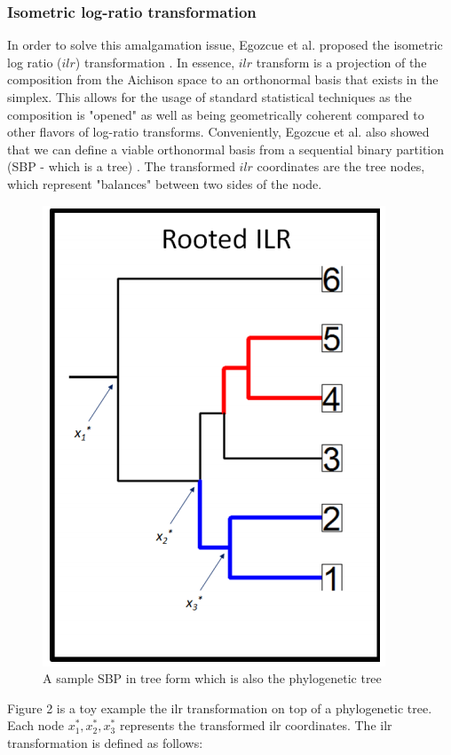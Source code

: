 \documentclass{article}
\begin{document}
\subsubsection{Isometric log-ratio transformation}
In order to solve this amalgamation issue, Egozcue et al. proposed the isometric log ratio ($ilr$) transformation \cite{egozcue2003}. In essence, $ilr$ transform is a projection of the composition from the Aichison space to an orthonormal basis that exists in the simplex. This allows for the usage of standard statistical techniques as the composition is "opened" as well as being geometrically coherent compared to other flavors of log-ratio transforms. Conveniently, Egozcue et al. also showed that we can define a viable orthonormal basis from a sequential binary partition (SBP - which is a tree) \cite{egozcue2003}. The transformed $ilr$ coordinates are the tree nodes, which represent "balances" between two sides of the node. 
\begin{figure}[!htb]
    \centering
    \includegraphics[scale = 0.5]{phylogeny_demonstration.png}
    \caption{A sample SBP in tree form which is also the phylogenetic tree}
    \label{fig:phylogeny_demonstration}
\end{figure}
Figure 2 is a toy example the ilr transformation on top of a phylogenetic tree. Each node $x_1^*, x_2^*, x_3^*$ represents the transformed ilr coordinates. The ilr transformation is defined as follows:
\end{document}
